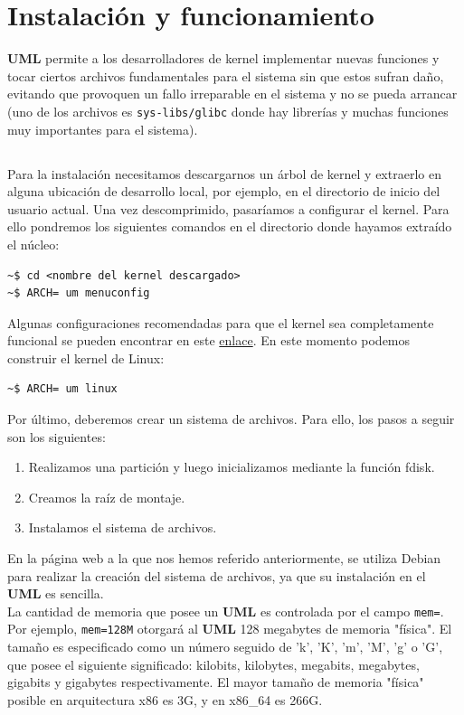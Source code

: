 \documentclass[11pt,twoside,titlepage,a4paper]{article}
\theoremstyle{definition}
\theoremstyle{plain_rojo}
\theoremstyle{remark}
\begin{document}
\section{Instalación y funcionamiento}

\textbf{UML} permite a los desarrolladores de kernel implementar nuevas 
funciones y tocar ciertos archivos fundamentales para el sistema sin que 
estos sufran daño, evitando que provoquen un fallo irreparable en el sistema 
y no se pueda arrancar (uno de los archivos es \texttt{sys-libs/glibc} donde 
hay librerías y muchas funciones muy importantes para el sistema).

\subsection*{\color{burdeos}{Instalación}}

Para la instalación necesitamos descargarnos un árbol de kernel y extraerlo 
en alguna ubicación de desarrollo local, por ejemplo, en el directorio de 
inicio del usuario actual. Una vez descomprimido, pasaríamos a configurar el 
kernel. Para ello pondremos los siguientes comandos en el directorio donde 
hayamos extraído el núcleo:
\begin{lstlisting}
~$ cd <nombre del kernel descargado>
~$ ARCH= um menuconfig
\end{lstlisting}
Algunas configuraciones recomendadas para que el kernel sea completamente 
funcional se pueden encontrar en este \href{https://web2.clarkson.edu/class/cs644/kernel/setup/uml/uml.html}{enlace}.
En este momento podemos construir el kernel de Linux:
\begin{lstlisting}
~$ ARCH= um linux
\end{lstlisting}
Por último, deberemos crear un sistema de archivos. Para ello, los pasos a 
seguir son los siguientes:
\begin{enumerate}[font={\color{rojooscuro}\bfseries}]
\item Realizamos una partición y luego inicializamos mediante la
función fdisk.
\item Creamos la raíz de montaje.
\item Instalamos el sistema de archivos.
\end{enumerate}
En la página web a la que nos hemos referido anteriormente, se utiliza Debian 
para realizar la creación del sistema de archivos, ya que su instalación en 
el \textbf{UML} es sencilla.
\\

La cantidad de memoria que posee un \textbf{UML} es controlada por el campo \texttt{mem=}. Por ejemplo, \texttt{mem=128M} otorgará al \textbf{UML} 128 megabytes de memoria "física". El tamaño es especificado como un número seguido de 'k', 'K', 'm', 'M', 'g' o 'G', que posee el siguiente significado: kilobits, kilobytes, megabits, megabytes, gigabits y gigabytes respectivamente. El mayor tamaño de memoria "física" posible en arquitectura x86 es 3G, y en x86\_64 es 266G.
\\
\end{document}
